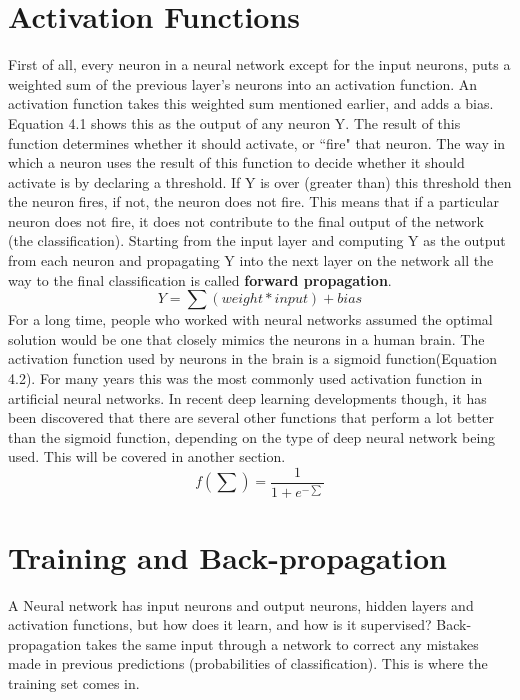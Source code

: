\documentclass[12pt]{report} %
\begin{document}
\section{Activation Functions}	
	First of all, every neuron in a neural network except for the input neurons, puts a weighted sum of the previous layer's neurons into an activation function. An activation function takes this weighted sum mentioned earlier, and adds a bias. Equation 4.1 shows this as the output of any neuron Y. The result of this function determines whether it should activate, or ``fire" that neuron. The way in which a neuron uses the result of this function to decide whether it should activate is by declaring a threshold. If Y is over (greater than) this threshold then the neuron fires, if not, the neuron does not fire. This means that if a particular neuron does not fire, it does not contribute to the final output of the network (the classification)\cite{activationMedium}. Starting from the input layer and computing Y as the output from each neuron and propagating Y into the next layer on the network all the way to the final classification is called \textbf{forward propagation}.
\begin{equation}
Y = \sum  (weight * input) + bias
\end{equation}	
	For a long time, people who worked with neural networks assumed the optimal solution would be one that closely mimics the neurons in a human brain. The activation function used by neurons in the brain is a sigmoid function(Equation 4.2)\cite{KubatMachineLearn}. For many years this was the most commonly used activation function in artificial neural networks. In recent deep learning developments though, it has been discovered that there are several other functions that perform a lot better than the sigmoid function, depending on the type of deep neural network being used. This will be covered in another section.
\begin{equation}
f(\sum) = \frac{1}{1+e^{-\sum}}
\end{equation}		 

\section{Training and Back-propagation}	

 	A Neural network has input neurons and output neurons, hidden layers and activation functions, but how does it learn, and how is it supervised? Back-propagation takes the same input through a network to correct any mistakes made in previous predictions (probabilities of classification). This is where the training set comes in. 
	
\end{document}
